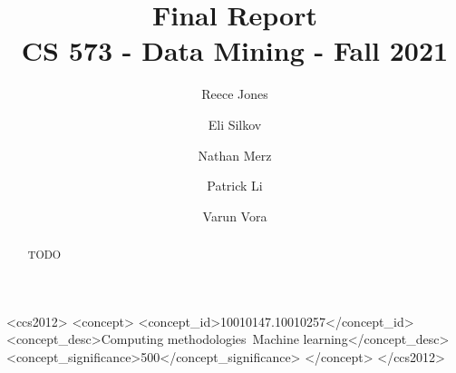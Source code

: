 \documentclass[sigconf]{acmart}
\begin{document}
\title{%
  Final Report \\
  \large CS 573 - Data Mining - Fall 2021}

\author{Reece Jones}

\author{Eli Silkov}

\author{Nathan Merz}

\author{Patrick Li}

\author{Varun Vora}

\renewcommand{\shortauthors}{Jones, Silkov, Merz, Li, Vora}

\begin{abstract}
TODO
\end{abstract}

\begin{CCSXML}
<ccs2012>
   <concept>
       <concept_id>10010147.10010257</concept_id>
       <concept_desc>Computing methodologies~Machine learning</concept_desc>
       <concept_significance>500</concept_significance>
       </concept>
 </ccs2012>
\end{CCSXML}

\end{document}
